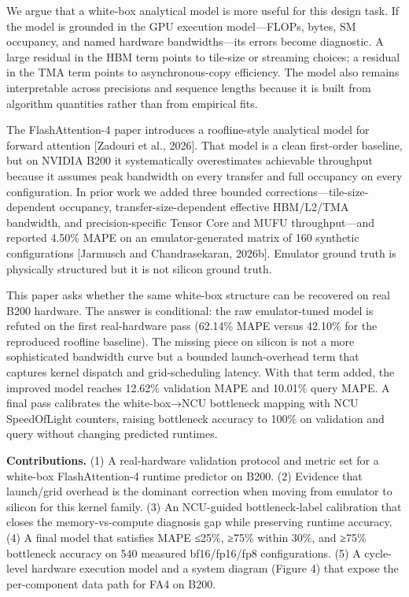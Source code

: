 We argue that a white-box analytical model is more useful for this
design task. If the model is grounded in the GPU execution
model---FLOPs, bytes, SM occupancy, and named hardware bandwidths---its
errors become diagnostic. A large residual in the HBM term points to
tile-size or streaming choices; a residual in the TMA term points to
asynchronous-copy efficiency. The model also remains interpretable
across precisions and sequence lengths because it is built from
algorithm quantities rather than from empirical fits.

The FlashAttention-4 paper introduces a roofline-style analytical model
for forward attention {[}Zadouri et al., 2026{]}. That model is a clean
first-order baseline, but on NVIDIA B200 it systematically overestimates
achievable throughput because it assumes peak bandwidth on every
transfer and full occupancy on every configuration. In prior work we
added three bounded corrections---tile-size-dependent occupancy,
transfer-size-dependent effective HBM/L2/TMA bandwidth, and
precision-specific Tensor Core and MUFU throughput---and reported 4.50\%
MAPE on an emulator-generated matrix of 160 synthetic configurations
{[}Jarmusch and Chandrasekaran, 2026b{]}. Emulator ground truth is
physically structured but it is not silicon ground truth.

This paper asks whether the same white-box structure can be recovered on
real B200 hardware. The answer is conditional: the raw emulator-tuned
model is refuted on the first real-hardware pass (62.14\% MAPE versus
42.10\% for the reproduced roofline baseline). The missing piece on
silicon is not a more sophisticated bandwidth curve but a bounded
launch-overhead term that captures kernel dispatch and grid-scheduling
latency. With that term added, the improved model reaches 12.62\%
validation MAPE and 10.01\% query MAPE. A final pass calibrates the
white-box→NCU bottleneck mapping with NCU SpeedOfLight counters, raising
bottleneck accuracy to 100\% on validation and query without changing
predicted runtimes.

\textbf{Contributions.} (1) A real-hardware validation protocol and
metric set for a white-box FlashAttention-4 runtime predictor on B200.
(2) Evidence that launch/grid overhead is the dominant correction when
moving from emulator to silicon for this kernel family. (3) An
NCU-guided bottleneck-label calibration that closes the
memory-vs-compute diagnosis gap while preserving runtime accuracy. (4) A
final model that satisfies MAPE ≤25\%, ≥75\% within 30\%, and ≥75\%
bottleneck accuracy on 540 measured bf16/fp16/fp8 configurations. (5) A
cycle-level hardware execution model and a system diagram (Figure 4)
that expose the per-component data path for FA4 on B200.

